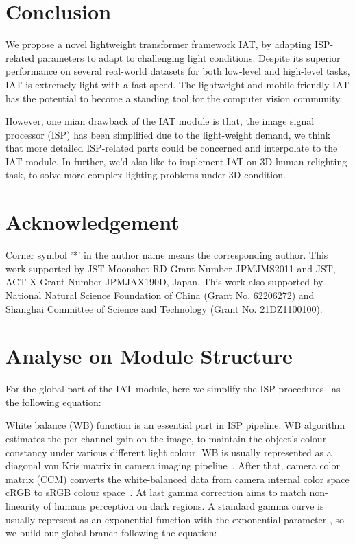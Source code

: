 \documentclass{bmvc2k}
\begin{document}
\section{Conclusion}
We propose a novel lightweight transformer framework IAT, by adapting ISP-related parameters to adapt to  challenging light conditions. Despite its superior performance on several real-world datasets for both low-level and high-level tasks, IAT is extremely light with a fast speed. The lightweight and mobile-friendly IAT has the potential to become a standing tool for the computer vision community. 

However, one  mian drawback of the IAT module is that, the image signal processor (ISP) has been simplified due to the light-weight demand, we think that more detailed ISP-related parts could be concerned and interpolate to the IAT module. In further, we'd also like to implement IAT on 3D human relighting task, to solve more complex lighting problems under 3D condition. 
\vspace{-2mm}

\section{Acknowledgement}
Corner symbol '*' in the author name means the corresponding author. 
This work supported by JST Moonshot RD Grant
Number JPMJMS2011 and JST, ACT-X Grant Number
JPMJAX190D, Japan. This work also supported by National Natural Science Foundation of China (Grant No.  62206272) and Shanghai Committee of Science and Technology (Grant No. 21DZ1100100).


\clearpage

\section{Analyse on Module Structure}

For the global part  of the IAT module, here we simplify the ISP procedures~\cite{brooks2019unprocessing,ICCV_MAET,ISP_uprocess_2021_ICCV} as the following equation:





White balance (WB) function is an essential part in ISP pipeline. WB algorithm estimates the per channel gain on the image, to maintain the object's colour constancy under various different light colour. WB is usually represented as a  diagonal von Kris matrix  in camera imaging pipeline~\cite{Afifi_2020_CVPR,afifi2022awb,brooks2019unprocessing,ISP_pipeline_eccv16}. After that, camera color matrix (CCM)  converts the white-balanced data from camera internal color space cRGB to sRGB colour space~\cite{ISP_pipeline_eccv16,ICCV_MAET,brooks2019unprocessing}. At last gamma correction aims to match non-linearity of humans perception on dark regions. A standard gamma curve is usually represent as an exponential function with the exponential parameter , so we build our global branch  following the equation:
\end{document}
